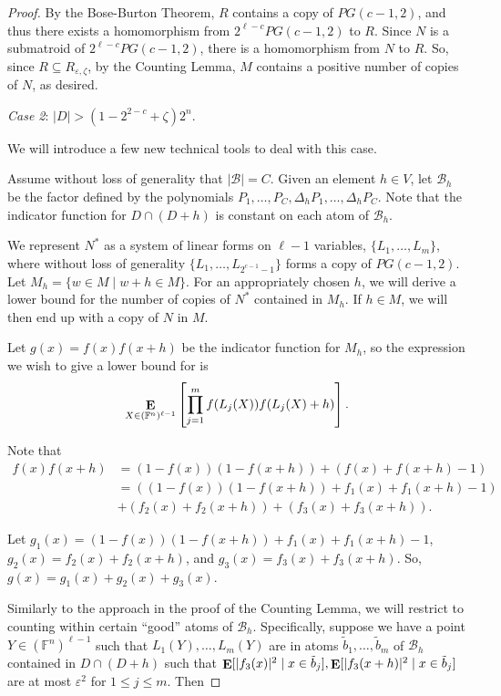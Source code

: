 \documentclass{article}
\theoremstyle{plain}
\theoremstyle{definition}
\theoremstyle{definition}
\theoremstyle{remark}
\numberwithin{equation}{section}
\newcommand{\FF}{\mathbb{F}}
\newcommand{\Esymb}{{\bf E}}
\DeclareMathOperator*{\E}{\Esymb}
\newcommand{\cB}{\mathcal B}
\begin{document}
\begin{proof}
By the Bose-Burton Theorem, $R$ contains a copy of $PG(c-1,2)$, and thus there exists a homomorphism from $2^{\ell-c} PG(c-1,2)$ to $R$. Since $N$ is a submatroid of $2^{\ell-c} PG(c-1,2)$, there is a homomorphism from $N$ to $R$. So, since $R\subseteq R_{\varepsilon,\zeta}$, by the Counting Lemma, $M$ contains a positive number of copies of $N$, as desired.

\emph{Case 2}: $|D|> (1-2^{2-c}+\zeta)2^n$.

We will introduce a few new technical tools to deal with this case.

Assume without loss of generality that $|\cB|=C$. Given an element $h\in V$, let $\cB_h$ be the factor defined by the polynomials $P_1,\dots,P_C,\Delta_h P_1,\dots,\Delta_h P_C$. Note that the indicator function for $D\cap (D+h)$ is constant on each atom of $\cB_h$.

We represent $N^*$ as a system of linear forms on $\ell-1$ variables, $\{L_1,\dots,L_m\}$, where without loss of generality $\{L_1,\dots,L_{2^{c-1}-1}\}$ forms a copy of $PG(c-1,2)$. Let $M_h=\{w\in M \mid w+h\in M\}$. For an appropriately chosen $h$, we will derive a lower bound for the number of copies of $N^*$ contained in $M_h$. If $h\in M$, we will then end up with a copy of $N$ in $M$.

Let $g(x)=f(x)f(x+h)$ be the indicator function for $M_h$, so the expression we wish to give a lower bound for is
\[\E_{X\in (\FF^n)^{\ell-1}}\left[ \prod_{j=1}^m f(L_j(X))f(L_j(X)+h)\right].\]

Note that
\begin{align*}
    f(x)f(x+h)&=(1-f(x))(1-f(x+h))+(f(x)+f(x+h)-1) \\
    &= ((1-f(x))(1-f(x+h))+f_1(x)+f_1(x+h)-1) \\
    & + (f_2(x)+f_2(x+h))+(f_3(x)+f_3(x+h)).
\end{align*}

Let $g_1(x)=(1-f(x))(1-f(x+h))+f_1(x)+f_1(x+h)-1$, $g_2(x)=f_2(x)+f_2(x+h)$, and $g_3(x)=f_3(x)+f_3(x+h)$. So, $g(x)=g_1(x)+g_2(x)+g_3(x)$.

Similarly to the approach in the proof of the Counting Lemma, we will restrict to counting within certain ``good'' atoms of $\cB_h$. Specifically, suppose we have a point $Y\in (\FF^n)^{\ell-1}$ such that $L_1(Y),\dots,L_m(Y)$ are in atoms $\tilde b_1,\dots,\tilde b_m$ of $\cB_h$ contained in $D\cap (D+h)$ such that $\E[|f_3(x)|^2 \mid x\in \tilde b_j],\E[|f_3(x+h)|^2 \mid x\in \tilde b_j]$ are at most $\varepsilon^2$ for $1\leq j\leq m$. Then


\end{proof}
\end{document}
